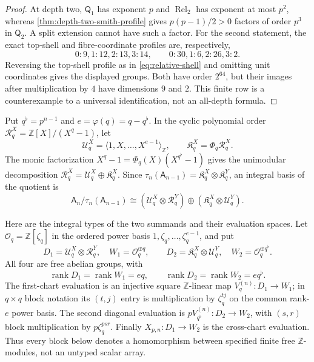 \documentclass[12pt,a4paper]{article}
\theoremstyle{definition}
\newcommand{\Z}{\mathbb Z}
\newcommand{\A}{\mathsf A}
\newcommand{\QQ}{\mathsf Q}
\newcommand{\Rel}{\operatorname{Rel}}
\newcommand{\rank}{\operatorname{rank}}
\begin{document}
\begin{proof}
At depth two, $\QQ_1$ has exponent $p$ and $\Rel_2$ has exponent at most
$p^2$, whereas \cref{thm:depth-two-smith-profile} gives $p(p-1)/2>0$ factors of order $p^3$
in $\QQ_2$.  A split extension cannot have such a factor.  For the second
statement, the exact top-shell and fibre-coordinate profiles are,
respectively,
\[
 0{:}9,1{:}12,2{:}13,3{:}14,
 \qquad 0{:}30,1{:}6,2{:}26,3{:}2.
\]
Reversing the top-shell profile as in \eqref{eq:relative-shell} and omitting
unit coordinates gives the displayed groups.  Both have order $2^{64}$,
but their images after multiplication by $4$ have dimensions $9$ and $2$.
This finite row is a counterexample to a universal identification, not an
all-depth formula.
\end{proof}

Put $q^\flat=p^{n-1}$ and $e=\varphi(q)=q-q^\flat$.  In the cyclic
polynomial order
$\mathscr R_q^X=\Z[X]/(X^q-1)$, let
\[
 \mathscr U_q^X=\langle1,X,\ldots,X^{e-1}\rangle_\Z,
 \qquad \mathfrak K_q^X=\Phi_q\mathscr R_q^X.
\]
The monic factorization $X^q-1=\Phi_q(X)(X^{q^\flat}-1)$ gives the unimodular
decomposition $\mathscr R_q^X=\mathscr U_q^X\oplus\mathfrak K_q^X$.
Since
$\tau_n(\A_{n-1})=\mathfrak K_q^X\otimes\mathfrak K_q^Y$, an integral
basis of the quotient is
\begin{equation}\label{eq:quotient-basis}
 \A_n/\tau_n(\A_{n-1})\cong
 (\mathscr U_q^X\otimes\mathscr R_q^Y)
 \oplus(\mathfrak K_q^X\otimes\mathscr U_q^Y).
\end{equation}

Here are the integral types of the two summands and their evaluation spaces.
Let $\mathcal O_q=\Z[\zeta_q]$ in the ordered power basis
$1,\zeta_q,\ldots,\zeta_q^{e-1}$, and put
\[
 D_1=\mathscr U_q^X\otimes\mathscr R_q^Y,
 \quad W_1=\mathcal O_q^{\oplus q},
 \qquad
 D_2=\mathfrak K_q^X\otimes\mathscr U_q^Y,
 \quad W_2=\mathcal O_q^{\oplus q^\flat}.
\]
All four are free abelian groups, with
\[
 \rank D_1=\rank W_1=eq,
 \qquad \rank D_2=\rank W_2=eq^\flat.
\]
The first-chart evaluation is an injective square $\Z$-linear map
$V_q^{(n)}:D_1\to W_1$; in $q\times q$ block notation its $(t,j)$ entry is
multiplication by $\zeta_q^{tj}$ on the common rank-$e$ power basis.  The
second diagonal evaluation is
$pV_{q^\flat}^{(n)}:D_2\to W_2$, with $(s,r)$ block multiplication by
$p\zeta_q^{psr}$.  Finally $X_{p,n}:D_1\to W_2$ is the cross-chart
evaluation.  Thus every block below denotes a homomorphism between specified
finite free $\Z$-modules, not an untyped scalar array.
\end{document}

